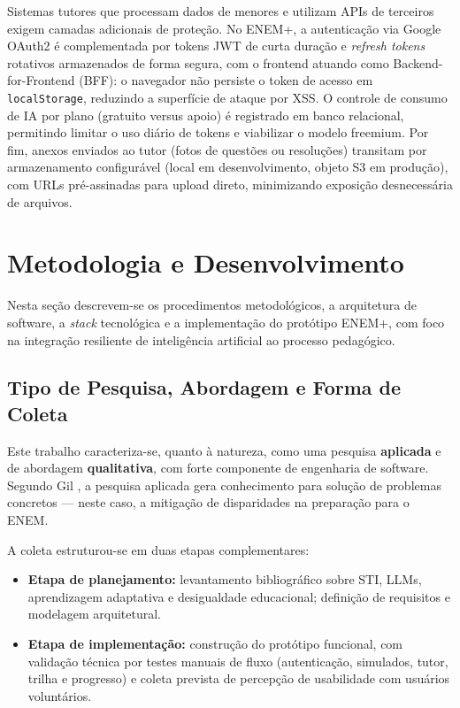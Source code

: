 \documentclass[12pt]{article}
\begin{document}
Sistemas tutores que processam dados de menores e utilizam APIs de terceiros exigem camadas adicionais de proteção. No ENEM+, a autenticação via Google OAuth2 é complementada por tokens JWT de curta duração e \textit{refresh tokens} rotativos armazenados de forma segura, com o frontend atuando como Backend-for-Frontend (BFF): o navegador não persiste o token de acesso em \texttt{localStorage}, reduzindo a superfície de ataque por XSS. O controle de consumo de IA por plano (gratuito versus apoio) é registrado em banco relacional, permitindo limitar o uso diário de tokens e viabilizar o modelo freemium. Por fim, anexos enviados ao tutor (fotos de questões ou resoluções) transitam por armazenamento configurável (local em desenvolvimento, objeto S3 em produção), com URLs pré-assinadas para upload direto, minimizando exposição desnecessária de arquivos.

\section{Metodologia e Desenvolvimento}
\label{sec:metodologia}

Nesta seção descrevem-se os procedimentos metodológicos, a arquitetura de software, a \textit{stack} tecnológica e a implementação do protótipo ENEM+, com foco na integração resiliente de inteligência artificial ao processo pedagógico.

\subsection{Tipo de Pesquisa, Abordagem e Forma de Coleta}

Este trabalho caracteriza-se, quanto à natureza, como uma pesquisa \textbf{aplicada} e de abordagem \textbf{qualitativa}, com forte componente de engenharia de software. Segundo Gil \cite{gil2022como}, a pesquisa aplicada gera conhecimento para solução de problemas concretos --- neste caso, a mitigação de disparidades na preparação para o ENEM.

A coleta estruturou-se em duas etapas complementares:
\begin{itemize}
    \item \textbf{Etapa de planejamento:} levantamento bibliográfico sobre STI, LLMs, aprendizagem adaptativa e desigualdade educacional; definição de requisitos e modelagem arquitetural.
    \item \textbf{Etapa de implementação:} construção do protótipo funcional, com validação técnica por testes manuais de fluxo (autenticação, simulados, tutor, trilha e progresso) e coleta prevista de percepção de usabilidade com usuários voluntários.
\end{itemize}
\end{document}
